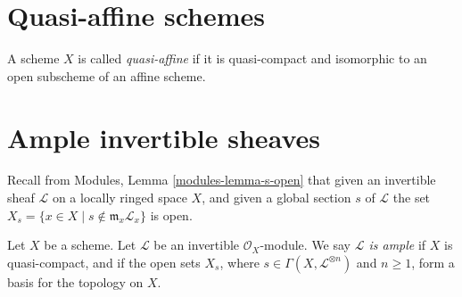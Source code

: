 \section{Quasi-affine schemes}
\label{section-quasi-affine}




\begin{definition}
\label{definition-quasi-affine}
A scheme $X$ is called {\it quasi-affine} if it is quasi-compact
and isomorphic to an open subscheme of an affine scheme.
\end{definition}





\section{Ample invertible sheaves}
\label{section-ample}

\noindent
Recall from Modules, Lemma \ref{modules-lemma-s-open}
that given an invertible sheaf $\mathcal{L}$ on a locally ringed
space $X$, and given a global section $s$ of $\mathcal{L}$
the set $X_s = \{x \in X \mid s \not \in \mathfrak m_x\mathcal{L}_x\}$
is open.

\begin{definition}
\label{definition-ample}
Let $X$ be a scheme.
Let $\mathcal{L}$ be an invertible $\mathcal{O}_X$-module.
We say {\it $\mathcal{L}$ is ample} if $X$ is quasi-compact, and
if the open sets $X_s$, where $s \in \Gamma(X, \mathcal{L}^{\otimes n})$
and $n \geq 1$, form a basis for the topology on $X$.
\end{definition}















